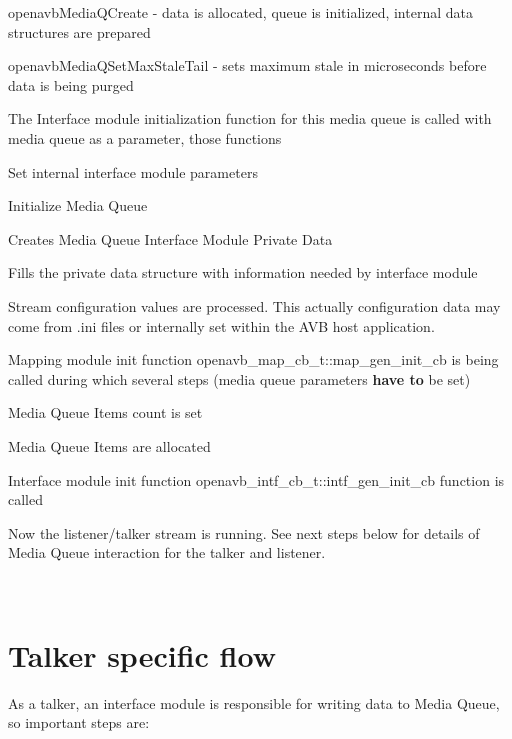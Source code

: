 \begin{DoxyItemize}
\item openavb\+Media\+Q\+Create -\/ data is allocated, queue is initialized, internal data structures are prepared
\item openavb\+Media\+Q\+Set\+Max\+Stale\+Tail -\/ sets maximum stale in microseconds before data is being purged
\item The Interface module initialization function for this media queue is called with media queue as a parameter, those functions
\begin{DoxyItemize}
\item Set internal interface module parameters
\item Initialize Media Queue
\begin{DoxyItemize}
\item Creates Media Queue Interface Module Private Data
\item Fills the private data structure with information needed by interface module
\end{DoxyItemize}
\end{DoxyItemize}
\item Stream configuration values are processed. This actually configuration data may come from .ini files or internally set within the A\+VB host application.
\item Mapping module init function openavb\+\_\+map\+\_\+cb\+\_\+t\+::map\+\_\+gen\+\_\+init\+\_\+cb is being called during which several steps (media queue parameters {\bfseries have to} be set)
\begin{DoxyItemize}
\item Media Queue Items count is set
\item Media Queue Items are allocated
\end{DoxyItemize}
\item Interface module init function openavb\+\_\+intf\+\_\+cb\+\_\+t\+::intf\+\_\+gen\+\_\+init\+\_\+cb function is called
\end{DoxyItemize}

Now the listener/talker stream is running. See next steps below for details of Media Queue interaction for the talker and listener.

~\newline
\hypertarget{sdk_notes_media_queue_usage_media_queue_usage_talker}{}\section{Talker specific flow  }\label{sdk_notes_media_queue_usage_media_queue_usage_talker}
As a talker, an interface module is responsible for writing data to Media Queue, so important steps are\+:


